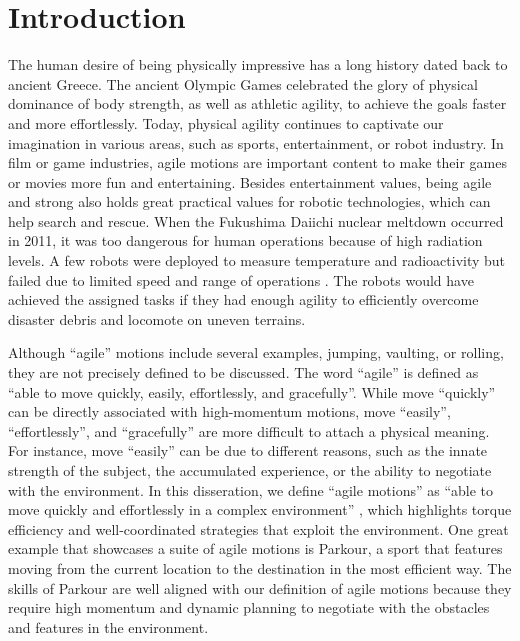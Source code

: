 \chapter{Introduction}

The human desire of being physically impressive has a long history
dated back to ancient Greece.
The ancient Olympic Games celebrated the glory of physical dominance of
body strength, as well as athletic agility, to achieve the goals
faster and more effortlessly. 
Today, physical agility continues to captivate our imagination in
various areas, such as sports, entertainment, or robot industry.
In film or game industries, agile motions are important content to make
their games or movies more fun and entertaining.
Besides entertainment values, being agile and strong also holds great practical
values for robotic technologies,
which can help search and rescue.
When the Fukushima Daiichi nuclear meltdown occurred in 2011,
it was too dangerous for human operations because of high radiation levels.
A few robots were deployed to
measure temperature and radioactivity but failed due to limited speed and range
of operations \cite{Fukushima:2014:URL}.
The robots would have achieved the assigned tasks if they had
enough agility to efficiently overcome disaster debris and locomote on uneven
terrains. 

Although ``agile'' motions include several examples, jumping,
vaulting, or rolling, they are not precisely defined to be discussed.
The word ``agile'' is defined as 
``able to move quickly, easily, effortlessly, and gracefully''.
While move ``quickly'' can be directly associated with high-momentum
motions, move ``easily'', ``effortlessly'', and ``gracefully'' are more
difficult to attach a physical meaning.
For instance, move ``easily'' can be due to different reasons, such as the
innate strength of the subject, the accumulated 
experience, or the ability to negotiate with the environment.
In this disseration, we define ``agile motions'' as 
``able to move quickly and effortlessly in a complex environment''
, which highlights torque efficiency
and well-coordinated strategies that exploit the environment.
One great example that showcases a suite of agile motions is Parkour,
a sport that features moving from the current location to the destination in
the most efficient way.
The skills of Parkour are well aligned with our definition of agile motions
because they require high momentum and dynamic planning to negotiate with the
obstacles and features in the environment.

